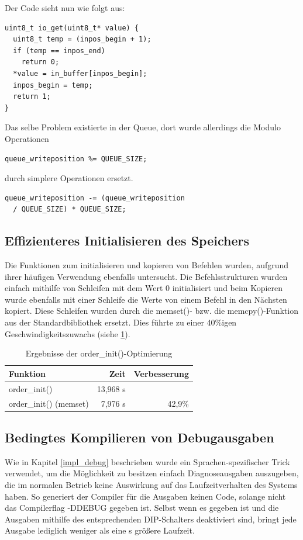 Der Code sieht nun wie folgt aus:
\begin{verbatim}
uint8_t io_get(uint8_t* value) {
  uint8_t temp = (inpos_begin + 1);
  if (temp == inpos_end)
    return 0;
  *value = in_buffer[inpos_begin];
  inpos_begin = temp;
  return 1;
}
\end{verbatim}
Das selbe Problem existierte in der Queue, dort wurde allerdings die Modulo Operationen
\begin{verbatim}
queue_writeposition %= QUEUE_SIZE;
\end{verbatim}
durch simplere Operationen ersetzt.
\begin{verbatim}
queue_writeposition -= (queue_writeposition
  / QUEUE_SIZE) * QUEUE_SIZE;
\end{verbatim}
\subsection{Effizienteres Initialisieren des Speichers}
Die Funktionen zum initialisieren und kopieren von Befehlen wurden, aufgrund ihrer häufigen Verwendung ebenfalls
untersucht. Die Befehlsstrukturen wurden einfach mithilfe von Schleifen mit dem Wert 0 initialisiert und beim
Kopieren wurde ebenfalls mit einer Schleife die Werte von einem Befehl in den Nächsten kopiert. Diese Schleifen
wurden durch die memset()- bzw. die memcpy()-Funktion aus der Standardbibliothek ersetzt. Dies führte zu einer
40\%igen Geschwindigkeitszuwachs (siehe \ref{order_init_meas}).
\begin{table}[htb]
\begin{center}
	\begin{tabular}{|l||r|r|}
		\hline
		\textbf{Funktion} & \textbf{Zeit} & \textbf{Verbesserung} \\ \hline \hline
		order\_init() & 13,968 \textmu{}s & \\ \hline
		order\_init() (memset) & 7,976 \textmu{}s & 42,9\% \\ \hline
	\end{tabular}
	\caption{\label{order_init_meas} Ergebnisse der order\_init()-Optimierung}
\end{center}
\end{table}
\subsection{Bedingtes Kompilieren von Debugausgaben}
Wie in Kapitel \ref{impl_debug} beschrieben wurde ein Sprachen-spezifischer Trick verwendet, um 
die Möglichkeit zu besitzen einfach Diagnoseausgaben auszugeben, die im normalen Betrieb keine Auswirkung
auf das Laufzeitverhalten des Systems haben. So generiert der Compiler für die Ausgaben keinen Code, solange nicht
das Compilerflag -DDEBUG gegeben ist. Selbst wenn es gegeben ist und die Ausgaben mithilfe des entsprechenden DIP-Schalters
deaktiviert sind, bringt jede Ausgabe lediglich weniger als eine \textmu{}s größere Laufzeit.
